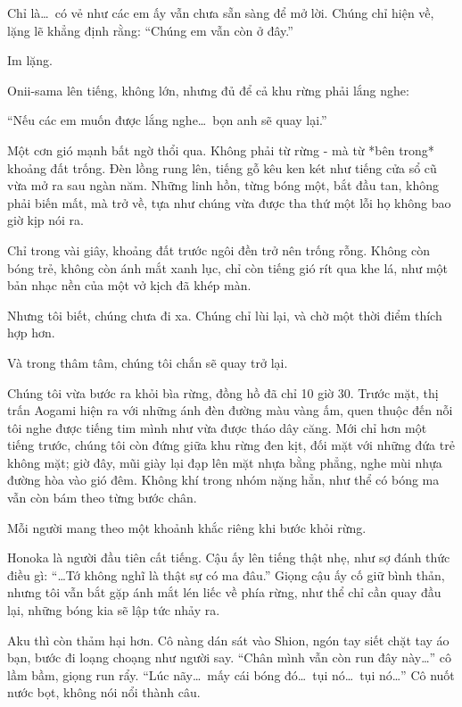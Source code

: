 \documentclass[../main.tex]{subfiles}
\begin{document}
Chỉ là\dots\ có vẻ như các em ấy vẫn chưa sẵn sàng để mở lời. Chúng chỉ hiện về, lặng lẽ khẳng định rằng: ``Chúng em vẫn còn ở đây.''

Im lặng.

Onii-sama lên tiếng, không lớn, nhưng đủ để cả khu rừng phải lắng nghe:

``Nếu các em muốn được lắng nghe\dots\ bọn anh sẽ quay lại.''

Một cơn gió mạnh bất ngờ thổi qua. Không phải từ rừng - mà từ *bên trong* khoảng đất trống. Đèn lồng rung lên, tiếng gỗ kêu ken két như tiếng cửa sổ cũ vừa mở ra sau ngàn năm. Những linh hồn, từng bóng một, bắt đầu tan, không phải biến mất, mà trở về, tựa như chúng vừa được tha thứ một lỗi họ không bao giờ kịp nói ra.

Chỉ trong vài giây, khoảng đất trước ngôi đền trở nên trống rỗng. Không còn bóng trẻ, không còn ánh mắt xanh lục, chỉ còn tiếng gió rít qua khe lá, như một bản nhạc nền của một vở kịch đã khép màn.

Nhưng tôi biết, chúng chưa đi xa. Chúng chỉ lùi lại, và chờ một thời điểm thích hợp hơn.

Và trong thâm tâm, chúng tôi chắn sẽ quay trở lại.

\ct

Chúng tôi vừa bước ra khỏi bìa rừng, đồng hồ đã chỉ 10 giờ 30. Trước mặt, thị trấn Aogami hiện ra với những ánh đèn đường màu vàng ấm, quen thuộc đến nỗi tôi nghe được tiếng tim mình như vừa được tháo dây căng. Mới chỉ hơn một tiếng trước, chúng tôi còn đứng giữa khu rừng đen kịt, đối mặt với những đứa trẻ không mặt; giờ đây, mũi giày lại đạp lên mặt nhựa bằng phẳng, nghe mùi nhựa đường hòa vào gió đêm. Không khí trong nhóm nặng hẳn, như thể có bóng ma vẫn còn bám theo từng bước chân.

Mỗi người mang theo một khoảnh khắc riêng khi bước khỏi rừng.

Honoka là người đầu tiên cất tiếng. Cậu ấy lên tiếng thật nhẹ, như sợ đánh thức điều gì: ``\dots Tớ không nghĩ là thật sự có ma đâu.'' Giọng cậu ấy cố giữ bình thản, nhưng tôi vẫn bắt gặp ánh mắt lén liếc về phía rừng, như thể chỉ cần quay đầu lại, những bóng kia sẽ lập tức nhảy ra.

Aku thì còn thảm hại hơn. Cô nàng dán sát vào Shion, ngón tay siết chặt tay áo bạn, bước đi loạng choạng như người say. ``Chân mình vẫn còn run đây này\dots'' cô lầm bầm, giọng run rẩy. ``Lúc nãy\dots\ mấy cái bóng đó\dots\ tụi nó\dots\ tụi nó\dots'' Cô nuốt nước bọt, không nói nổi thành câu.
\end{document}
